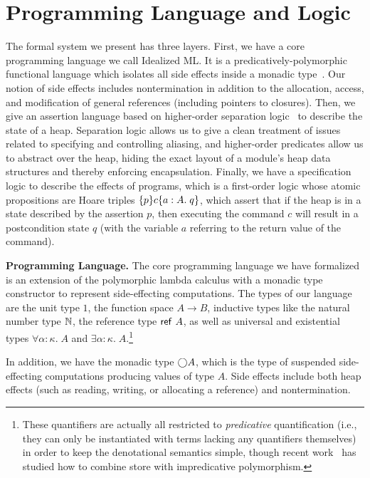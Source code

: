 \documentclass[natbib]{sigplanconf}
\begin{document}
\section{Programming Language and Logic}
\label{sec:logic}
The formal system we present has three layers. First, we have a core
programming language we call Idealized ML. It is a
predicatively-polymorphic functional language which isolates all side
effects inside a monadic type~\cite{pfenning-davies}. Our notion of
side effects includes nontermination in addition to the allocation,
access, and modification of general references (including pointers to
closures).  Then, we give an assertion language based on higher-order
separation logic~\cite{hosl} to describe the state of a
heap. Separation logic allows us to give a clean treatment of issues
related to specifying and controlling aliasing, and higher-order
predicates allow us to abstract over the heap, hiding the exact layout
of a module's heap data structures and thereby enforcing
encapsulation.  Finally, we have a specification logic to describe the
effects of programs, which is a first-order logic whose atomic
propositions are Hoare triples $\{{p}\}{c}\{{a:A}.\;{q}\}$, which assert
that if the heap is in a state described by the assertion $p$, then
executing the command $c$ will result in a postcondition state $q$
(with the variable $a$ referring to the return value of the command).


\textbf{Programming Language.} The core programming language we have
formalized is an extension of the polymorphic lambda calculus with a
monadic type constructor to represent side-effecting computations.
The types of our language are the unit type $1$, the function space $A
\to B$, inductive types like the natural number type $\mathbb{N}$, the reference type
$\mbox{\textsf{{ref }}}A$, as well as universal and existential types $\forall
\alpha:\kappa.\;A$ and $\exists \alpha:\kappa.\;A$.\footnote{These
  quantifiers are actually all restricted to \emph{predicative}
  quantification (i.e., they can only be instantiated with terms
  lacking any quantifiers themselves) in order to keep the
  denotational semantics simple, though recent
  work~\cite{birkedal-impred} has studied how to combine store with
  impredicative polymorphism.}

In addition, we have the monadic type $\bigcirc{A}$, which is the type
of suspended side-effecting computations producing values of type
$A$. Side effects include both heap effects (such as reading, writing,
or allocating a reference) and nontermination.
\end{document}

